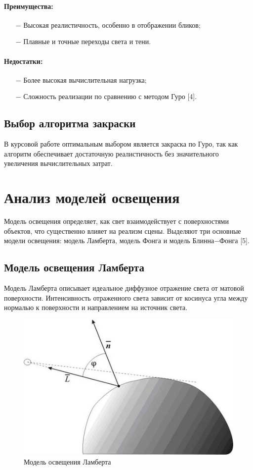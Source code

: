\paragraph{Преимущества:}
\begin{itemize}
	\item[$-$] Высокая реалистичность, особенно в отображении бликов;
    \item[$-$] Плавные и точные переходы света и тени.
\end{itemize}
\paragraph{Недостатки:}
\begin{itemize}
	\item[$-$] Более высокая вычислительная нагрузка;
    \item[$-$] Сложность реализации по сравнению с методом Гуро [4].
\end{itemize}

\subsection{Выбор алгоритма закраски}

В курсовой работе оптимальным выбором является закраска по Гуро, так как алгоритм обеспечивает достаточную реалистичность без значительного увеличения вычислительных затрат.

\section{Анализ моделей освещения}

Модель освещения определяет, как свет взаимодействует с поверхностями объектов, что существенно влияет на реализм сцены. Выделяют три основные модели освещения: модель Ламберта, модель
Фонга и модель Блинна$-$Фонга [5].

\subsection{Модель освещения Ламберта}

Модель Ламберта описывает идеальное диффузное отражение света от матовой поверхности. Интенсивность отраженного света зависит от косинуса угла между нормалью к поверхности и направлением на источник света.

\begin{figure}[h]
    \centering
    \includegraphics[width=0.3\linewidth]{img/1-5-1-lambert.jpg}
    \caption{Модель освещения Ламберта}
    \label{fig:1-5-1-lambert}
\end{figure}


